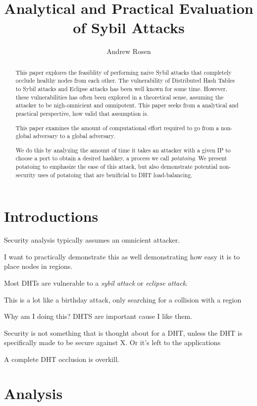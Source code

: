 \documentclass[10pt,a4paper]{article}
\author{Andrew Rosen}
\title{Analytical and Practical Evaluation of Sybil Attacks}
\begin{document}
\maketitle

\begin{abstract}
This paper explores the feasiblity of performing naive Sybil attacks that completely occlude healthy nodes from each other.
The vulnerability of Distributed Hash Tables to Sybil attacks and Eclipse attacks has been well known for some time.
However, these vulnerabilities has often been explored in a theoretical sense, assuming the attacker to be nigh-omnicient and omnipotent. 
This paper seeks from a analytical and practical perspective, how valid that assumption is.

This paper examines the amount of computational effort required to go from a non-global adversary to a global adversary.


We do this by analyzing the amount of time it takes an attacker with a given IP to choose a port to obtain a desired hashkey, a process we call \emph{potatoing}.
We present potatoing to emphasize the ease of this attack, but also demonstrate potential non-security uses of potatoing that are benificial to DHT load-balancing. 
\end{abstract}

\section{Introductions}
Security analysis typically assumes an omnicient attacker. 

I want to practically demonstrate this as well demonstrating how easy it is to place nodes in regions.

Most DHTs are vulnerable to a \textit{sybil attack} or \textit{eclipse attack}.


This is a lot like a birthday attack, only searching for a collision with a region


Why am I doing this?
DHTS are important cause I like them.

Security is not something that is thought about for a DHT, unless the 
DHT is specifically made to be secure against X.  
Or it's left to the applications


A complete DHT occlusion is overkill.
\section{Analysis}
\end{document}
